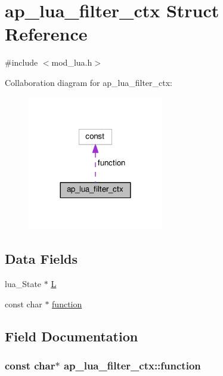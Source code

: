 \hypertarget{structap__lua__filter__ctx}{}\section{ap\+\_\+lua\+\_\+filter\+\_\+ctx Struct Reference}
\label{structap__lua__filter__ctx}


{\ttfamily \#include $<$mod\+\_\+lua.\+h$>$}



Collaboration diagram for ap\+\_\+lua\+\_\+filter\+\_\+ctx\+:
\nopagebreak
\begin{figure}[H]
\begin{center}
\leavevmode
\includegraphics[width=168pt]{structap__lua__filter__ctx__coll__graph}
\end{center}
\end{figure}
\subsection*{Data Fields}
\begin{DoxyCompactItemize}
\item 
lua\+\_\+\+State $\ast$ \hyperlink{structap__lua__filter__ctx_af72dd375b471934b229eeb8c306980c4}{L}
\item 
const char $\ast$ \hyperlink{structap__lua__filter__ctx_a90fa0eeb57eac3d4d8e9528ed58ab7af}{function}
\end{DoxyCompactItemize}


\subsection{Field Documentation}
\subsubsection[{\texorpdfstring{function}{function}}]{\setlength{\rightskip}{0pt plus 5cm}const char$\ast$ ap\+\_\+lua\+\_\+filter\+\_\+ctx\+::function}\hypertarget{structap__lua__filter__ctx_a90fa0eeb57eac3d4d8e9528ed58ab7af}{}\label{structap__lua__filter__ctx_a90fa0eeb57eac3d4d8e9528ed58ab7af}
